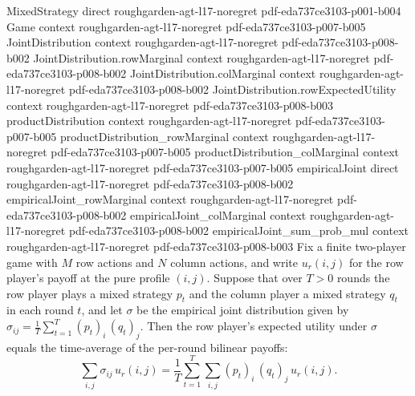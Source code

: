 \begin{lemma}
\label{empiricalJoint_rowExpectedUtility}
\leanok
{}
\proofstep
  {MixedStrategy}
  {direct}
  {roughgarden-agt-l17-noregret}
  {pdf-eda737ce3103-p001-b004}
\proofstep
  {Game}
  {context}
  {roughgarden-agt-l17-noregret}
  {pdf-eda737ce3103-p007-b005}
\proofstep
  {JointDistribution}
  {context}
  {roughgarden-agt-l17-noregret}
  {pdf-eda737ce3103-p008-b002}
\proofstep
  {JointDistribution.rowMarginal}
  {context}
  {roughgarden-agt-l17-noregret}
  {pdf-eda737ce3103-p008-b002}
\proofstep
  {JointDistribution.colMarginal}
  {context}
  {roughgarden-agt-l17-noregret}
  {pdf-eda737ce3103-p008-b002}
\proofstep
  {JointDistribution.rowExpectedUtility}
  {context}
  {roughgarden-agt-l17-noregret}
  {pdf-eda737ce3103-p008-b003}
\proofstep
  {productDistribution}
  {context}
  {roughgarden-agt-l17-noregret}
  {pdf-eda737ce3103-p007-b005}
\proofstep
  {productDistribution_rowMarginal}
  {context}
  {roughgarden-agt-l17-noregret}
  {pdf-eda737ce3103-p007-b005}
\proofstep
  {productDistribution_colMarginal}
  {context}
  {roughgarden-agt-l17-noregret}
  {pdf-eda737ce3103-p007-b005}
\proofstep
  {empiricalJoint}
  {direct}
  {roughgarden-agt-l17-noregret}
  {pdf-eda737ce3103-p008-b002}
\proofstep
  {empiricalJoint_rowMarginal}
  {context}
  {roughgarden-agt-l17-noregret}
  {pdf-eda737ce3103-p008-b002}
\proofstep
  {empiricalJoint_colMarginal}
  {context}
  {roughgarden-agt-l17-noregret}
  {pdf-eda737ce3103-p008-b002}
\proofstep
  {empiricalJoint_sum_prob_mul}
  {context}
  {roughgarden-agt-l17-noregret}
  {pdf-eda737ce3103-p008-b003}
Fix a finite two-player game with $M$ row actions and $N$ column actions, and write
$u_r(i,j)$ for the row player's payoff at the pure profile $(i,j)$. Suppose that over $T
> 0$ rounds the row player plays a mixed strategy $p_t$ and the column player a mixed
strategy $q_t$ in each round $t$, and let $\sigma$ be the empirical joint distribution
given by $\sigma_{ij} = \frac{1}{T}\sum_{t=1}^{T}(p_t)_i\,(q_t)_j$. Then the row
player's expected utility under $\sigma$ equals the time-average of the per-round
bilinear payoffs:
\[
  \sum_{i,j}\sigma_{ij}\,u_r(i,j)
    = \frac{1}{T}\sum_{t=1}^{T}\sum_{i,j}(p_t)_i\,(q_t)_j\,u_r(i,j).
\]
\end{lemma}


